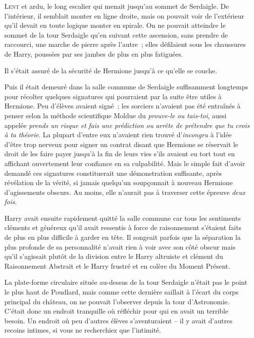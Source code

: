 
\lettrine{L}{ent} et ardu, le long escalier qui menait jusqu'au sommet de Serdaigle. De l'intérieur, il semblait monter en ligne droite, mais on pouvait voir de l'extérieur qu'il devait en toute logique monter en spirale. On ne pouvait atteindre le sommet de la tour Serdaigle qu'en suivant cette ascension, sans prendre de raccourci, une marche de pierre après l'autre~; elles défilaient sous les chaussures de Harry, poussées par ses jambes de plus en plus fatiguées.

Il s'était assuré de la sécurité de Hermione jusqu'à ce qu'elle se couche.

Puis il était demeuré dans la salle commune de Serdaigle suffisamment longtemps pour récolter quelques signatures qui pourraient par la suite être utiles à Hermione. Peu d'élèves avaient signé~; les sorciers n'avaient pas été entraînés à penser selon la méthode scientifique Moldue du \emph{prouve-le ou tais-toi}, aussi appelée \emph{prends un risque et fais une prédiction ou arrête de prétendre que tu crois à ta théorie}. La plupart d'entre eux n'avaient rien trouvé d'\emph{incongru} à l'idée d'être trop nerveux pour signer un contrat disant que Hermione se réservait le droit de les faire payer jusqu'à la fin de leurs vies s'ils avaient eu tort tout en affichant ouvertement leur confiance en sa culpabilité. Mais le simple fait d'avoir demandé ces signatures constituerait une démonstration suffisante, après révélation de la vérité, si jamais quelqu'un soupçonnait à nouveau Hermione d'agissements obscurs. Au moins, elle n'aurait pas à traverser cette épreuve \emph{deux fois}.

Harry avait ensuite rapidement quitté la salle commune car tous les sentiments cléments et généreux qu'il avait ressentis à force de raisonnement s'étaient faits de plus en plus difficile à garder en tête. Il songeait parfois que la séparation la plus profonde de sa personnalité n'avait rien à voir avec son côté obscur mais qu'il s'agissait plutôt de la division entre le Harry altruiste et clément du Raisonnement Abstrait et le Harry frustré et en colère du Moment Présent.

La plate-forme circulaire située au-dessus de la tour Serdaigle n'était pas le point le plus haut de Poudlard, mais comme cette dernière saillait à l'écart du corps principal du château, on ne pouvait l'observer depuis la tour d'Astronomie. C'était donc un endroit tranquille où réfléchir pour qui en avait un terrible besoin. Un endroit où peu d'autres élèves s'aventuraient -- il y avait d'autres recoins intimes, si vous ne recherchiez que l'intimité.


